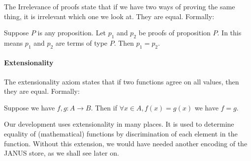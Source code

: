The Irrelevance of proofs state that if we have two ways of proving
the same thing, it is irrelevant which one we look at. They are
equal. Formally:
\begin{axm}
  Suppose $P$ is any proposition. Let $p_1$ and $p_2$ be proofs of
  proposition $P$. In \coq{} this means $p_1$ and $p_2$ are terms of
  type $P$. Then $p_1 = p_2$.
\end{axm}

\paragraph{Extensionality}
\label{coqext:extensionality}

The extensionality axiom states that if two functions agree on all
values, then they are equal. Formally:
\begin{axm}
  Suppose we have $f, g \colon A \to B$. Then if $\forall x \in A,
  f(x) = g(x)$ we have $f = g$.
\end{axm}
Our development uses extensionality in many places. It is used to
determine equality of (mathematical) functions by discrimination of
each element in the function. Without this extension, we would have
needed another encoding of the JANUS store, as we shall see later
on.

